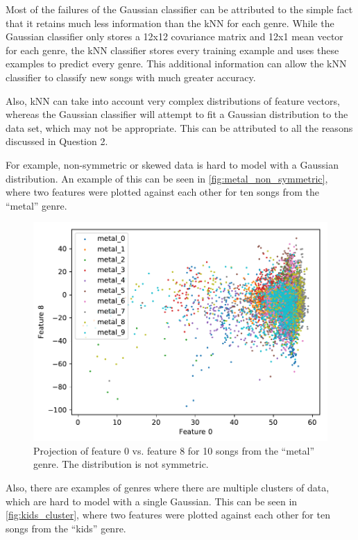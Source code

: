 \documentclass[a4paper,titlepage]{article}
\begin{document}
	Most of the failures of the Gaussian classifier can be attributed to the simple fact that it retains much less information than the kNN for each genre. While the Gaussian classifier only stores a 12x12 covariance matrix and 12x1 mean vector for each genre, the kNN classifier stores every training example and uses these examples to predict every genre. This additional information can allow the kNN classifier to classify new songs with much greater accuracy.
		
	Also, kNN can take into account very complex distributions of feature vectors, whereas the Gaussian classifier will attempt to fit a Gaussian distribution to the data set, which may not be appropriate. This can be attributed to all the reasons discussed in Question 2.
	
	For example, non-symmetric or skewed data is hard to model with a Gaussian distribution. An example of this can be seen in \autoref{fig:metal_non_symmetric}, where two features were plotted against each other for ten songs from the ``metal'' genre.
	
	
	\begin{figure}[!htb]
		\centering
		\includegraphics[width=\columnwidth]{plots/metal_non_symmetric.pdf}
		\caption
		{Projection of feature 0 vs. feature 8 for 10 songs from the ``metal'' genre. The distribution is not symmetric.}
		\label{fig:metal_non_symmetric}
	\end{figure}

	Also, there are examples of genres where there are multiple clusters of data, which are hard to model with a single Gaussian. This can be seen in \autoref{fig:kids_cluster}, where two features were plotted against each other for ten songs from the ``kids'' genre.
	
\end{document}
